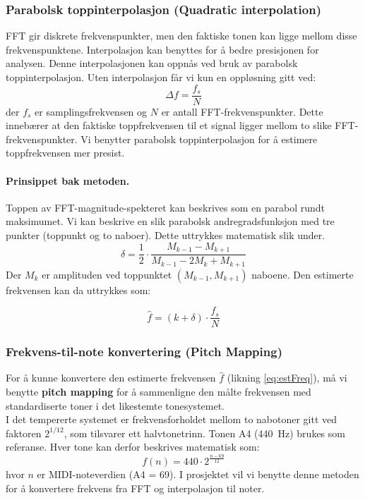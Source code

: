 \clearpage

\subsubsection{Parabolsk toppinterpolasjon (Quadratic interpolation)}
FFT gir diskrete frekvenspunkter, men den faktiske tonen kan ligge mellom disse frekvenspunktene. Interpolasjon kan benyttes for å bedre presisjonen for analysen. Denne interpolasjonen kan oppnås ved bruk av parabolsk toppinterpolasjon. Uten interpolasjon får vi kun en oppløsning gitt ved:
\[
    \Delta f = \frac{f_s}{N}
\]
\noindent
der $f_s$ er samplingsfrekvensen og $N$ er antall FFT-frekvenspunkter. Dette innebærer at den faktiske toppfrekvensen til et signal ligger mellom to slike FFT-frekvenspunkter. Vi benytter parabolsk toppinterpolasjon for å estimere toppfrekvensen mer presist. \\
\paragraph{Prinsippet bak metoden.} Toppen av FFT-magnitude-spekteret kan beskrives som en parabol rundt maksimumet. Vi kan beskrive en slik parabolsk andregradsfunksjon med tre punkter (toppunkt og to naboer). Dette uttrykkes matematisk slik under.
\[
    \delta = \frac{1}{2} \cdot \frac{M_{k-1} - M_{k + 1}}{M_{k - 1} - 2M_k + M_{k + 1}}
\]
\noindent
Der $M_k$ er amplituden ved toppunktet $(M_{k-1}, M_{k + 1})$ naboene. Den estimerte frekvensen kan da uttrykkes som:

\begin{equation}
    \hat{f}=\left( k + \delta \right) \cdot \frac{f_s}{N}
    \label{eq:estFreq}
\end{equation}

\subsubsection{Frekvens-til-note konvertering (Pitch Mapping)}
For å kunne konvertere den estimerte frekvensen $\hat{f}$ (likning \ref{eq:estFreq}), må vi benytte \textbf{pitch mapping} for å sammenligne den målte frekvensen med standardiserte toner i det likestemte tonesystemet. \\
I det tempererte systemet er frekvensforholdet mellom to nabotoner gitt ved faktoren $2^{1/12}$, som tilsvarer ett halvtonetrinn. 
Tonen A4 (440~Hz) brukes som referanse. 
Hver tone kan derfor beskrives matematisk som:
\[
    f(n) = 440 \cdot 2^{\frac{n - 69}{12}}
\]
hvor $n$ er MIDI-noteverdien (A4 = 69). I prosjektet vil vi benytte denne metoden for å konvertere frekvens fra FFT og interpolasjon til noter.



